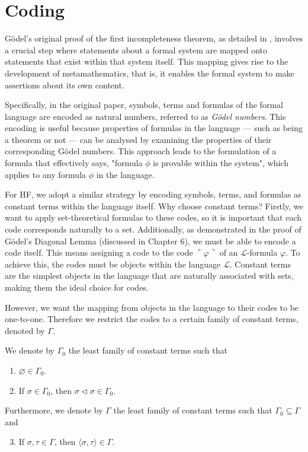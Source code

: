 \chapter{Coding}

Gödel's original proof of the first incompleteness theorem, 
as detailed in \cite{godel1931formal}, 
involves a crucial step where statements about a formal system are mapped onto statements that 
exist within that system itself. 
This mapping gives rise to the development of metamathematics, that is, 
it enables the formal system to make assertions about its own content.

Specifically, in the original paper, symbols, terms and formulas of the formal language are encoded 
as natural numbers, referred to as \textit{Gödel numbers}. 
This encoding is useful because properties of formulas in the language 
— such as being a theorem or not — 
can be analysed by examining the properties of their corresponding Gödel numbers. 
This approach leads to the formulation of a formula that effectively says, 
"formula $\phi$ is provable within the system", which applies to any formula $\phi$ in the language.

For HF, we adopt a similar strategy by encoding symbols, terms, and formulas 
as constant terms within the language itself. Why choose constant terms?
Firstly, we want to apply set-theoretical formulas to these codes, 
so it is important that each code corresponds naturally to a set. 
Additionally, as demonstrated in the proof of Gödel’s Diagonal Lemma (discussed in Chapter 6), 
we must be able to encode a code itself. 
This means assigning a code to the code $\ulcorner{\varphi}\urcorner$ of an 
$\mathcal{L}$-formula $\varphi$. 
To achieve this, the codes must be objects within the language $\mathcal{L}$. 
Constant terms are the simplest objects in the language that are naturally associated with sets, 
making them the ideal choice for codes.

However, we want the mapping from objects in the language to their codes to be one-to-one.
Therefore we restrict the codes to a certain family of constant terms, denoted by $\Gamma$.

\begin{definition}
    \label{def:IsInΓ0+IsInΓ+Code}
    \leanok
    We denote by $\Gamma_0$ the least family of constant terms such that
    \begin{enumerate}
        \item $\varnothing \in \Gamma_0$.
        \item If $\sigma \in \Gamma_0$, then $\sigma \lhd \sigma \in \Gamma_0$.
    \end{enumerate}
    Furthermore, we denote by $\Gamma$ the least family of constant terms such that 
    $\Gamma_0 \subseteq \Gamma$ and 
    \begin{enumerate}\setcounter{enumi}{2} %
        \item If $\sigma, \tau \in \Gamma$, then $\langle\sigma, \tau\rangle \in \Gamma$.
    \end{enumerate}
\end{definition}

